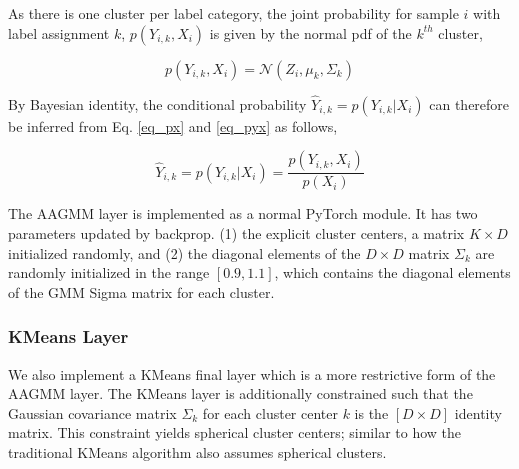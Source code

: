 \documentclass[10pt,twocolumn,letterpaper]{article}
\begin{document}
As there is one cluster per label category, the joint probability for sample $i$ with label assignment $k$, $p(Y_{i,k},X_i)$ is given by the normal pdf of the $k^{th}$ cluster,

\begin{equation}
	\label{eq_pyx}
	p(Y_{i,k},X_i) = \mathcal{N} (Z_i, \mu_{k}, \Sigma_k) \end{equation}

By Bayesian identity, the conditional probability $\hat{Y}_{i,k}=p(Y_{i,k}|X_i)$ can therefore be inferred from Eq. \ref{eq_px} and \ref{eq_pyx} as follows,

\begin{equation}
	\hat{Y}_{i,k} = p(Y_{i,k}|X_i) = \frac{p(Y_{i,k}, X_i)}{p(X_i)}
	\label{eq_conditional}
\end{equation}

The AAGMM layer is implemented as a normal PyTorch \cite{pytorch} module.
It has two parameters updated by backprop.
(1) the explicit cluster centers, a matrix $K \times D$ initialized randomly, and
(2) the diagonal elements of the $D \times D$ matrix $\Sigma_k$ are randomly initialized in the range $[0.9, 1.1]$, which contains the diagonal elements of the GMM Sigma matrix for each cluster.

\subsubsection{KMeans Layer}

We also implement a KMeans final layer which is a more restrictive form of the AAGMM layer.
The KMeans layer is additionally constrained such that the Gaussian covariance matrix $\Sigma_k$ for each cluster center $k$ is the $[D \times D]$ identity matrix. 
This constraint yields spherical cluster centers; similar to how the traditional KMeans algorithm also assumes spherical clusters.

\end{document}
